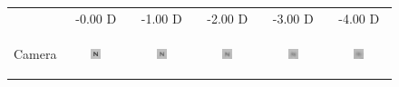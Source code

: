 
\begin{figure}[!th]
	\centering

	\begin{tabular}{@{}r@{ } c@{ } c@{ } c@{ } c@{ } c }
	&
	\small{-0.00 D} &
	\small{-1.00 D} &
	\small{-2.00 D} &
	\small{-3.00 D} &
	\small{-4.00 D} & \\

	\begin{sideways} \parbox[b]{20mm} {Camera} \end{sideways} &
	\includegraphics[width=0.185\textwidth]{../../__Images/05/WB_N(20-200)_-0D_to_-4D/wb_N_20-200_Camera-0,00D(lens).png} &
	\includegraphics[width=0.185\textwidth]{../../__Images/05/WB_N(20-200)_-0D_to_-4D/wb_N_20-200_Camera-1,00D(lens).png} &
	\includegraphics[width=0.185\textwidth]{../../__Images/05/WB_N(20-200)_-0D_to_-4D/wb_N_20-200_Camera-2,00D(lens).png} &
	\includegraphics[width=0.185\textwidth]{../../__Images/05/WB_N(20-200)_-0D_to_-4D/wb_N_20-200_Camera-3,00D(lens).png} &
	\includegraphics[width=0.185\textwidth]{../../__Images/05/WB_N(20-200)_-0D_to_-4D/wb_N_20-200_Camera-4,00D(lens).png} \\


\end{tabular}
\end{figure}
